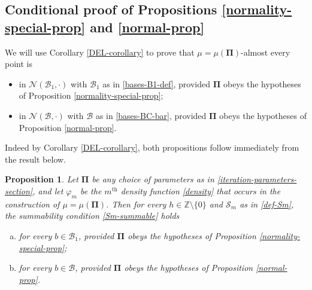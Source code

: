 \documentclass[12pt, twoside]{article}
\newtheorem{proposition}[theorem]{Proposition}
\theoremstyle{definition}
\numberwithin{equation}{section}
\begin{document}
\subsection{Conditional proof of Propositions \ref{normality-special-prop} and \ref{normal-prop}} 
\noindent We will use Corollary \ref{DEL-corollary} to prove that $\mu = \mu(\pmb{\Pi})$-almost every point is 
\begin{itemize} 
\item in $\mathscr{N}(\mathscr{B}_1, \cdot)$ with $\mathscr{B}_1$ as in \eqref{bases-B1-def}, provided $\pmb{\Pi}$ obeys the hypotheses of Proposition \ref{normality-special-prop};
\item in $\mathscr N(\mathscr{B}, \cdot)$ with $\mathscr{B}$ as in \eqref{bases-BC-bar}, provided $\pmb{\Pi}$ obeys the hypotheses of Proposition \ref{normal-prop}.
\end{itemize} 
Indeed by Corollary \ref{DEL-corollary}, both propositions follow immediately from the result below.
\begin{proposition} \label{DEL-difference-prop}
Let $\pmb{\Pi}$ be any choice of parameters as in \eqref{iteration-parameters-section}, and let $\varphi_m$ be the $m^{\text{th}}$ density function \eqref{density} that occurs in the construction of $\mu = \mu(\pmb{\Pi})$.  Then for every $h \in \mathbb Z \setminus \{0\}$ and $\mathscr{S}_m$ as in \eqref{def-Sm}, the summability condition \eqref{Sm-summable} holds 
\begin{enumerate}[(a)]
\item for every $b \in \mathscr{B}_1$, provided $\pmb{\Pi}$ obeys the hypotheses of Proposition \ref{normality-special-prop};   \label{DEL-difference-prop-parta}
\item for every $b \in \mathscr{B}$, provided $\pmb{\Pi}$ obeys the hypotheses of Proposition \ref{normal-prop}. \label{DEL-difference-prop-partb}
\end{enumerate} 
\end{proposition} 
\end{document}
